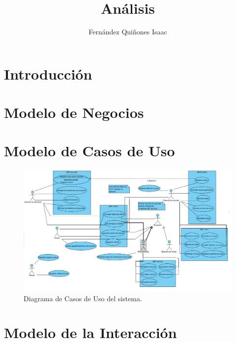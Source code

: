 \documentclass[oneside,10pt]{book}
\title{Análisis}
\subtitle{}
\author{Fernández Quiñones Isaac}
\begin{document}
\maketitle
\thispagestyle{empty}

\frontmatter
\tableofcontents

\mainmatter

\chapter{Introducción}


\chapter{Modelo de Negocios}


\chapter{Modelo de Casos de Uso}

\begin{figure}[htbp!]
		\centering
			\includegraphics[width=1.2\textwidth]{images/CasosDeUso}
		\caption{Diagrama de Casos de Uso del sistema.}
	\end{figure}
	

\chapter{Modelo de la Interacción}
\end{document}
